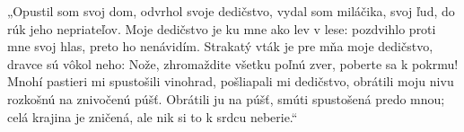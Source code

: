 „Opustil som svoj dom,
odvrhol svoje dedičstvo,
vydal som miláčika, svoj ľud,
do rúk jeho nepriateľov.
Moje dedičstvo je ku mne
ako lev v lese:
pozdvihlo proti mne svoj hlas,
preto ho nenávidím.
Strakatý vták je pre mňa moje dedičstvo,
dravce sú vôkol neho:
Nože, zhromaždite všetku poľnú zver,
poberte sa k pokrmu!
Mnohí pastieri mi spustošili vinohrad,
pošliapali mi dedičstvo,
obrátili moju nivu rozkošnú
na znivočenú púšť.
Obrátili ju na púšť,
smúti spustošená predo mnou;
celá krajina je zničená,
ale nik si to k srdcu neberie.“
